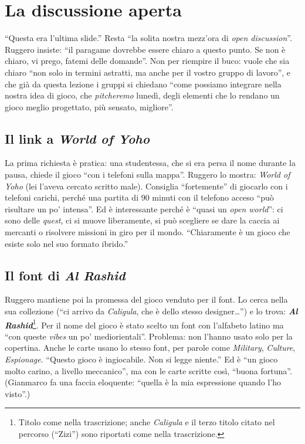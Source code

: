 \section{La discussione aperta}
\label{a10:sec:discussione}

``Questa era l'ultima slide.'' Resta ``la solita nostra mezz'ora di \emph{open
discussion}''. Ruggero insiste: ``il paragame dovrebbe essere chiaro a questo punto. Se
non è chiaro, vi prego, fatemi delle domande''. Non per riempire il buco: vuole che sia
chiaro ``non solo in termini astratti, ma anche per il vostro gruppo di lavoro'', e che
già da questa lezione i gruppi si chiedano ``come possiamo integrare nella nostra idea
di gioco, che \emph{pitcheremo} lunedì, degli elementi che lo rendano un gioco meglio
progettato, più sensato, migliore''.

\subsection{Il link a \emph{World of Yoho}}

La prima richiesta è pratica: una studentessa, che si era persa il nome durante la
pausa, chiede il gioco ``con i telefoni sulla mappa''. Ruggero lo mostra:
\emph{World of Yoho} (lei l'aveva cercato scritto male). Consiglia ``fortemente'' di
giocarlo con i telefoni carichi, perché una partita di 90 minuti con il telefono acceso
``può risultare un po' intensa''. Ed è interessante perché è ``quasi un \emph{open
world}'': ci sono delle \emph{quest}, ci si muove liberamente, si può scegliere se dare
la caccia ai mercanti o risolvere missioni in giro per il mondo. ``Chiaramente è un gioco
che esiste solo nel suo formato ibrido.''

\subsection{Il font di \emph{Al Rashid}}
\label{a10:sec:alrashid}

Ruggero mantiene poi la promessa del gioco venduto per il font. Lo cerca nella sua
collezione (``ci arrivo da \emph{Caligula}, che è dello stesso designer\dots'') e lo
trova: \textbf{\emph{Al Rashid}}\footnote{Titolo come nella trascrizione; anche
\emph{Caligula} e il terzo titolo citato nel percorso (``Zizi'') sono riportati come
nella trascrizione.}. Per il nome del gioco è stato scelto un font con l'alfabeto
latino ma ``con queste \emph{vibes} un po' mediorientali''. Problema: non l'hanno usato
solo per la copertina. Anche le carte usano lo stesso font, per parole come
\emph{Military}, \emph{Culture}, \emph{Espionage}. ``Questo gioco è ingiocabile. Non si
legge niente.'' Ed è ``un gioco molto carino, a livello meccanico'', ma con le carte
scritte così, ``buona fortuna''. (Gianmarco fa una faccia eloquente: ``quella è la mia
espressione quando l'ho visto''.)

